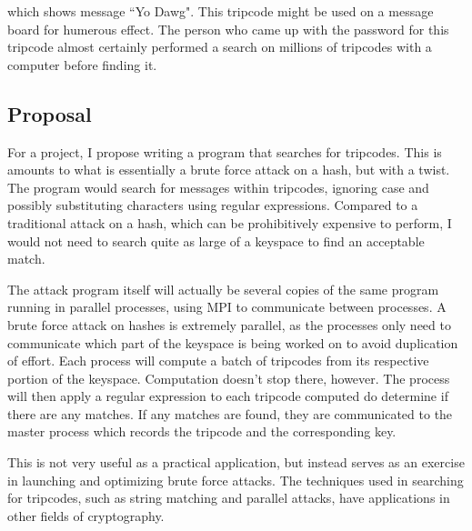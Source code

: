 \documentclass[12pt]{article}
\begin{document}
which shows message ``Yo Dawg". This tripcode might be used on a message board for humerous effect. The person who came up with the password for this tripcode almost certainly performed a search on millions of tripcodes with a computer before finding it.

\subsection*{Proposal}
For a project, I propose writing a program that searches for tripcodes. This is amounts to what is essentially a brute force attack on a hash, but with a twist. The program would search for messages within tripcodes, ignoring case and possibly substituting characters using regular expressions. Compared to a traditional attack on a hash, which can be prohibitively expensive to perform, I would not need to search quite as large of a keyspace to find an acceptable match.

The attack program itself will actually be several copies of the same program running in parallel processes, using MPI to communicate between processes. A brute force attack on hashes is extremely parallel, as the processes only need to communicate which part of the keyspace is being worked on to avoid duplication of effort. Each process will compute a batch of tripcodes from its respective portion of the keyspace. Computation doesn't stop there, however. The process will then apply a regular expression to each tripcode computed do determine if there are any matches. If any matches are found, they are communicated to the master process which records the tripcode and the corresponding key.

This is not very useful as a practical application, but instead serves as an exercise in launching and optimizing brute force attacks. The techniques used in searching for tripcodes, such as string matching and parallel attacks, have applications in other fields of cryptography.
\end{document}
